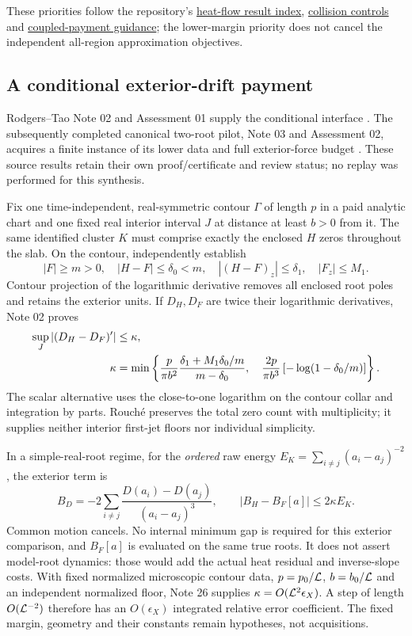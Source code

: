 These priorities follow the repository's
\href{run:\researchroot/result-summaries/11_newman_heat_flow_reductions_and_certificates.md}{heat-flow result index},
\href{run:\researchroot/result-summaries/12_collision_controls_and_screening.md}{collision controls}
and \href{run:\researchroot/avoid/12_term_by_term_matching_and_separate_bounds.md}{coupled-payment guidance};
the lower-margin priority does not cancel the independent all-region
approximation objectives.

\subsection{A conditional exterior-drift payment}
Rodgers--Tao Note 02 and Assessment 01 supply the conditional interface
\cite{rt-interface}. The subsequently completed canonical two-root pilot,
Note 03 and Assessment 02, acquires a finite instance of its lower data
and full exterior-force budget \cite{rt-pilot}. These source results
retain their own proof/certificate and review status; no replay was
performed for this synthesis.

Fix one time-independent, real-symmetric contour $\Gamma$ of length
$p$ in a paid analytic chart and one fixed real interior interval $J$
at distance at least $b>0$ from it. The same identified cluster $K$
must comprise exactly the enclosed $H$ zeros throughout the slab.
On the contour, independently establish
\[
 |F|\ge m>0,\quad |H-F|\le\delta_0<m,\quad
 |(H-F)_z|\le\delta_1,\quad |F_z|\le M_1.
\]
Contour projection of the logarithmic derivative removes all enclosed
root poles and retains the exterior units. If $D_H,D_F$ are twice their
logarithmic derivatives, Note 02 proves
\begin{align}
 \sup_J|(D_H-D_F)'|&\le\kappa,\notag\\
 \kappa&=\min\left\{
 \frac{p}{\pi b^2}\frac{\delta_1+M_1\delta_0/m}{m-\delta_0},\quad
 \frac{2p}{\pi b^3}\left[-\log(1-\delta_0/m)\right]\right\}.
 \label{eq:rt-contour}
\end{align}
The scalar alternative uses the close-to-one logarithm on the contour
collar and integration by parts. Rouch\'e preserves the total zero
count with multiplicity; it supplies neither interior first-jet floors
nor individual simplicity.

In a simple-real-root regime, for the \emph{ordered} raw energy
$E_K=\sum_{i\ne j}(a_i-a_j)^{-2}$, the exterior term is
\[
 B_D=-2\sum_{i\ne j}\frac{D(a_i)-D(a_j)}{(a_i-a_j)^3},
 \qquad |B_H-B_F[a]|\le2\kappa E_K.
\]
Common motion cancels. No internal minimum gap is required for this
exterior comparison, and $B_F[a]$ is evaluated on the same true roots.
It does not assert model-root dynamics: those would add the actual
heat residual and inverse-slope costs. With fixed normalized microscopic
contour data, $p=p_0/\mathcal L$, $b=b_0/\mathcal L$ and an independent normalized
floor, Note 26 supplies $\kappa=O(\mathcal L^2\epsilon_X)$. A step of
length $O(\mathcal L^{-2})$ therefore has an $O(\epsilon_X)$ integrated
relative error coefficient. The fixed margin, geometry and their
constants remain hypotheses, not acquisitions.

